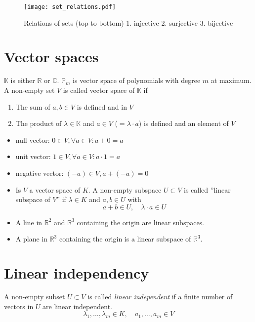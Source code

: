 \documentclass[a4paper,twocolumn]{article}
\begin{document}
\begin{figure}[h]
  \begin{center}
    \texttt{[image: set\_relations.pdf]}
    \caption{Relations of sets (top to bottom)
        1. injective
        2. surjective
        3. bijective
    }
    \label{fig:set_relations}
  \end{center}
\end{figure}

\section{Vector spaces}

$\mathbb{K}$ is either $\mathbb{R}$ or $\mathbb{C}$.
$\mathbb{P}_m$ is vector space of polynomials with degree
$m$ at maximum.
A non-empty set $V$ is called vector space of $\mathbb{K}$ if

\begin{enumerate}
  \item The sum of $a, b \in V$ is defined and in $V$
  \item The product of $\lambda \in \mathbb{K}$ and $a \in V$
        ($= \lambda \cdot a$) is defined and an element of $V$
\end{enumerate}

\begin{itemize}
  \item null vector: $0 \in V, \forall a \in V: a + 0 = a$
  \item unit vector: $1 \in V, \forall a \in V: a \cdot 1 = a$
  \item negative vector: $(-a) \in V, a + (-a) = 0$
  \item Is $V$ a vector space of $K$. A non-empty subspace $U \subset V$
        is called ''linear subspace of $V$'' if $\lambda \in K$ and
        $a, b \in U$ with
        \[
            a + b \in U,
                \quad \lambda \cdot a \in U
        \]
  \item A line in $\mathbb{R}^2$ and $\mathbb{R}^3$ containing the origin
        are linear subspaces.
  \item A plane in $\mathbb{R}^3$ containing the origin is a linear
        subspace of $\mathbb{R}^3$.
\end{itemize}

\section{Linear independency}

A non-empty subset $U \subset V$ is called \emph{linear independent} if
a finite number of vectors in $U$ are linear independent.
%
\[
    \lambda_1, \ldots, \lambda_m \in K,
    \quad a_1, \ldots, a_m \in V
\]
\end{document}
